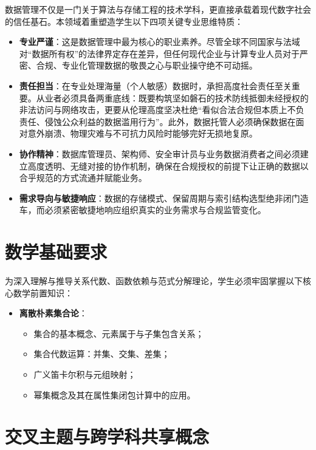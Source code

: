 数据管理不仅是一门关于算法与存储工程的技术学科，更直接承载着现代数字社会的信任基石。本领域着重塑造学生以下四项关键专业思维特质：
\begin{itemize}
    \item \textbf{专业严谨}：这是数据管理中最为核心的职业素养。尽管全球不同国家与法域对“数据所有权”的法律界定存在差异，但任何现代企业与计算专业人员对于严密、合规、专业化管理数据的敬畏之心与职业操守绝不可动摇。
    \item \textbf{责任担当}：在专业处理海量（个人敏感）数据时，承担高度社会责任至关重要。从业者必须具备两重底线：既要构筑坚如磐石的技术防线抵御未经授权的非法访问与网络攻击，更要从伦理高度坚决杜绝“看似合法合规但本质上不负责任、侵蚀公众利益的数据滥用行为”。此外，数据托管人必须确保数据在面对意外崩溃、物理灾难与不可抗力风险时能够完好无损地复原。
    \item \textbf{协作精神}：数据库管理员、架构师、安全审计员与业务数据消费者之间必须建立高度透明、无缝对接的协作机制，确保在合规授权的前提下让正确的数据以合乎规范的方式流通并赋能业务。
    \item \textbf{需求导向与敏捷响应}：数据的存储模式、保留周期与索引结构选型绝非闭门造车，而必须紧密敏捷地响应组织真实的业务需求与合规监管变化。
\end{itemize}

\section{数学基础要求}

为深入理解与推导关系代数、函数依赖与范式分解理论，学生必须牢固掌握以下核心数学前置知识：
\begin{itemize}
    \item \textbf{离散朴素集合论}：
    \begin{itemize}
        \item 集合的基本概念、元素属于与子集包含关系；
        \item 集合代数运算：并集、交集、差集；
        \item 广义笛卡尔积与元组映射；
        \item 幂集概念及其在属性集闭包计算中的应用。
    \end{itemize}
\end{itemize}

\section{交叉主题与跨学科共享概念}

